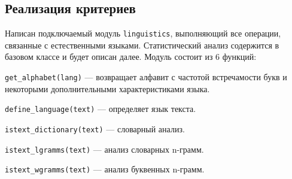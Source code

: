 \subsection{Реализация критериев}
Написан подключаемый модуль \texttt{linguistics}, выполняющий все операции, 
связанные с естественными языками. Статистический анализ
содержится в базовом классе и будет описан далее.
Модуль состоит из 6 функций:

\begin{trivlist}
\item \texttt{get\_alphabet(lang)} --- возвращает алфавит с частотой встречамости 
    букв и некоторыми дополнительными характеристиками языка.
\item \texttt{define\_language(text)} --- определяет язык текста.
\item \texttt{istext\_dictionary(text)} --- словарный анализ.
\item \texttt{istext\_lgramms(text)} --- анализ словарных n-грамм.
\item \texttt{istext\_wgramms(text)} --- анализ буквенных n-грамм.
\end{trivlist}
